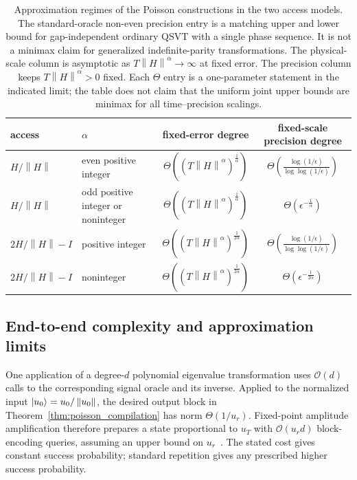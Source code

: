 \documentclass[aps,pra,reprint,floatfix,unsortedaddress,superscriptaddress]{revtex4-2}
\newcommand{\norm}[1]{\left\lVert#1\right\rVert}
\newcommand{\Ocal}{\mathcal{O}}
\begin{document}
\begin{table}[t]
\caption{Approximation regimes of the Poisson constructions in the two
access models.  The standard-oracle non-even precision entry is a
matching upper and lower bound for gap-independent ordinary QSVT with
a single phase sequence.  It is not a minimax claim for generalized
indefinite-parity transformations.  The
physical-scale column is asymptotic as
$T\norm{H}^{\alpha}\to\infty$ at fixed error.  The precision column
keeps $T\norm{H}^{\alpha}>0$ fixed.  Each $\Theta$ entry is a
one-parameter statement in the indicated limit; the table does not
claim that the uniform joint upper bounds are minimax for all
time--precision scalings.}
\label{tab:degree_regimes}
\begin{ruledtabular}
\begin{tabular}{llcc}
access & $\alpha$ & fixed-error degree & fixed-scale precision degree \\
\hline
 $H/\norm{H}$ & even positive integer
& $\Theta((T\norm{H}^{\alpha})^{\frac{1}{\alpha}})$
& $\Theta\!\left(\frac{\log(1/\epsilon)}{\log\log(1/\epsilon)}\right)$ \\
 $H/\norm{H}$ & odd positive integer or noninteger
& $\Theta((T\norm{H}^{\alpha})^{\frac{1}{\alpha}})$
& $\Theta(\epsilon^{-\frac{1}{\alpha}})$
\\
 $2H/\norm{H}-I$ & positive integer
& $\Theta((T\norm{H}^{\alpha})^{\frac{1}{2\alpha}})$
& $\Theta\!\left(\frac{\log(1/\epsilon)}{\log\log(1/\epsilon)}\right)$ \\
 $2H/\norm{H}-I$ & noninteger
& $\Theta((T\norm{H}^{\alpha})^{\frac{1}{2\alpha}})$
& $\Theta(\epsilon^{-\frac{1}{2\alpha}})$
\end{tabular}
\end{ruledtabular}
\end{table}

\subsection{End-to-end complexity and approximation limits}
\label{subsec:complexity}

One application of a degree-$d$ polynomial eigenvalue transformation
uses $\Ocal(d)$ calls to the corresponding signal oracle and its
inverse.  Applied to the
normalized input $\ket{u_0}=u_0/\norm{u_0}$, the desired output block
in Theorem~\ref{thm:poisson_compilation} has norm
$\Theta(1/u_r)$.  Fixed-point amplitude amplification therefore
prepares a state proportional to $u_T$ with
$\Ocal(u_r d)$ block-encoding queries, assuming an upper bound on
$u_r$~\cite{Yoder2014fixedpoint}.  The stated cost gives constant
success probability; standard repetition gives any prescribed higher
success probability.
\end{document}
